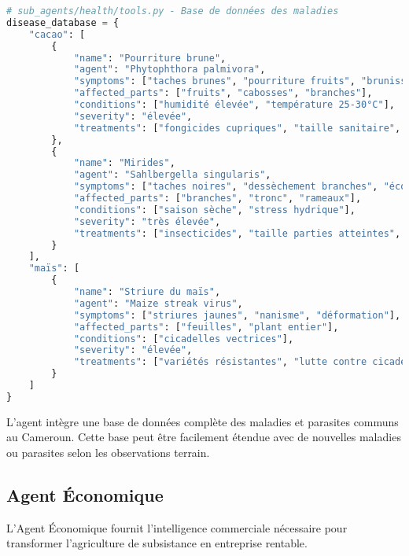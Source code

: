  
\begin{lstlisting}[language=Python, caption=Base de données phytosanitaire]
# sub_agents/health/tools.py - Base de données des maladies
disease_database = {
    "cacao": [
        {
            "name": "Pourriture brune",
            "agent": "Phytophthora palmivora",
            "symptoms": ["taches brunes", "pourriture fruits", "brunissement cabosses"],
            "affected_parts": ["fruits", "cabosses", "branches"],
            "conditions": ["humidité élevée", "température 25-30°C"],
            "severity": "élevée",
            "treatments": ["fongicides cupriques", "taille sanitaire", "amélioration drainage"]
        },
        {
            "name": "Mirides",
            "agent": "Sahlbergella singularis",
            "symptoms": ["taches noires", "dessèchement branches", "écoulement sève"],
            "affected_parts": ["branches", "tronc", "rameaux"],
            "conditions": ["saison sèche", "stress hydrique"],
            "severity": "très élevée",
            "treatments": ["insecticides", "taille parties atteintes", "amélioration ombrage"]
        }
    ],
    "maïs": [
        {
            "name": "Striure du maïs",
            "agent": "Maize streak virus",
            "symptoms": ["striures jaunes", "nanisme", "déformation"],
            "affected_parts": ["feuilles", "plant entier"],
            "conditions": ["cicadelles vectrices"],
            "severity": "élevée",
            "treatments": ["variétés résistantes", "lutte contre cicadelles"]
        }
    ]
}
\end{lstlisting}

L'agent intègre une base de données complète des maladies et parasites communs au Cameroun. Cette base peut être facilement étendue avec de nouvelles maladies ou parasites selon les observations terrain.

\subsection{Agent Économique}

L'Agent Économique fournit l'intelligence commerciale nécessaire pour transformer l'agriculture de subsistance en entreprise rentable.


